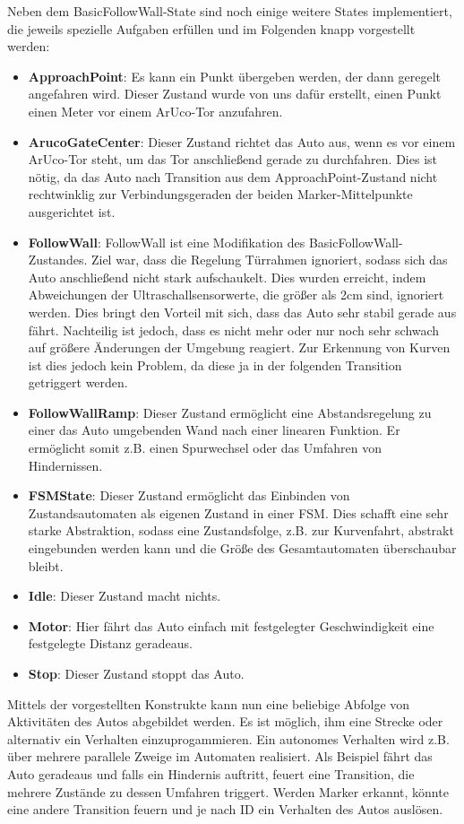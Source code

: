 Neben dem BasicFollowWall-State sind noch einige weitere States implementiert, die jeweils spezielle Aufgaben erfüllen und im Folgenden knapp vorgestellt werden:
\begin{itemize}
	\item \textbf{ApproachPoint}: Es kann ein Punkt übergeben werden, der dann geregelt angefahren wird. Dieser Zustand wurde von uns dafür erstellt, einen Punkt einen Meter vor einem ArUco-Tor anzufahren.
	\item \textbf{ArucoGateCenter}: Dieser Zustand richtet das Auto aus, wenn es vor einem ArUco-Tor steht, um das Tor anschließend gerade zu durchfahren. Dies ist nötig, da das Auto nach Transition aus dem ApproachPoint-Zustand nicht rechtwinklig zur Verbindungsgeraden der beiden Marker-Mittelpunkte ausgerichtet ist.
	\item \textbf{FollowWall}: FollowWall ist eine Modifikation des BasicFollowWall-Zustandes. Ziel war, dass die Regelung Türrahmen ignoriert, sodass sich das Auto anschließend nicht stark aufschaukelt. Dies wurden erreicht, indem Abweichungen der Ultraschallsensorwerte, die größer als 2cm sind, ignoriert werden. Dies bringt den Vorteil mit sich, dass das Auto sehr stabil gerade aus fährt. Nachteilig ist jedoch, dass es nicht mehr oder nur noch sehr schwach auf größere Änderungen der Umgebung reagiert. Zur Erkennung von Kurven ist dies jedoch kein Problem, da diese ja in der folgenden Transition getriggert werden.
	\item \textbf{FollowWallRamp}: Dieser Zustand ermöglicht eine Abstandsregelung zu einer das Auto umgebenden Wand nach einer linearen Funktion. Er ermöglicht somit z.B. einen Spurwechsel oder das Umfahren von Hindernissen.
	\item \textbf{FSMState}: Dieser Zustand ermöglicht das Einbinden von Zustandsautomaten als eigenen Zustand in einer FSM. Dies schafft eine sehr starke Abstraktion, sodass eine Zustandsfolge, z.B. zur Kurvenfahrt, abstrakt eingebunden werden kann und die Größe des Gesamtautomaten überschaubar bleibt.
	\item \textbf{Idle}: Dieser Zustand macht nichts. 
	\item \textbf{Motor}: Hier fährt das Auto einfach mit festgelegter Geschwindigkeit eine festgelegte Distanz geradeaus.
	\item \textbf{Stop}: Dieser Zustand stoppt das Auto.
\end{itemize}
Mittels der vorgestellten Konstrukte kann nun eine beliebige Abfolge von Aktivitäten des Autos abgebildet werden. Es ist möglich, ihm eine Strecke oder alternativ ein Verhalten einzuprogammieren. Ein autonomes Verhalten wird z.B. über mehrere parallele Zweige im Automaten realisiert. Als Beispiel fährt das Auto geradeaus und falls ein Hindernis auftritt, feuert eine Transition, die mehrere Zustände zu dessen Umfahren triggert. Werden Marker erkannt, könnte eine andere Transition feuern und je nach ID ein Verhalten des Autos auslösen.

